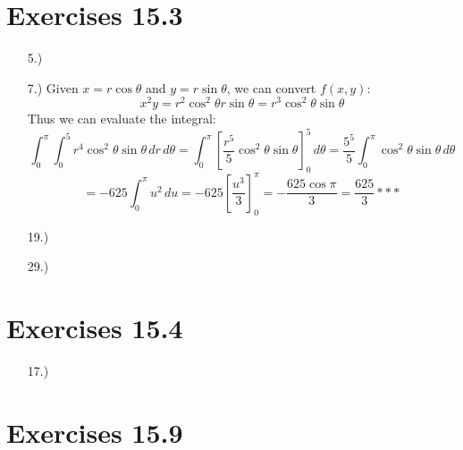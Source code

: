 \documentclass[12pt]{article}
\newcommand{\bracks}[1]{\left[#1\right]}
\begin{document}
\section*{Exercises 15.3}
\begin{itemize}
    \item [5.)] 

    \item [7.)] Given $x=r\cos\theta$ and $y=r\sin\theta$, we can convert $f(x,y)$:
    \[x^2y=r^2\cos^2\theta r\sin\theta=r^3\cos^2\theta\sin\theta\]
    Thus we can evaluate the integral:
    \[\int^\pi_0\int^5_0 r^4\cos^2\theta\sin\theta\,dr\,d\theta=\int^\pi_0\bracks{\frac{r^5}{5}\cos^2\theta\sin\theta}^5_0\,d\theta=\frac{5^5}{5}\int^\pi_0\cos^2\theta\sin\theta\,d\theta\]
    \[=-625\int^\pi_0u^2\,du=-625\bracks{\frac{u^3}{3}}^\pi_0=-\frac{625\cos\pi}{3}=\frac{625}{3}***\]

    \item [19.)] 

    \item [29.)]

\end{itemize}

\section*{Exercises 15.4}
\begin{itemize}
    \item [17.)]

\end{itemize}

\section*{Exercises 15.9}
\end{document}
